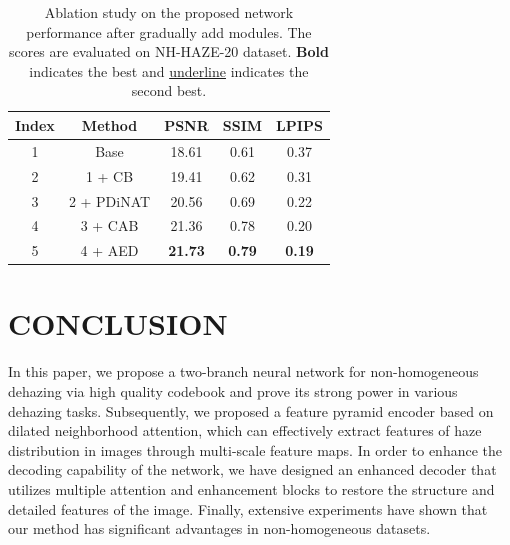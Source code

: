 \documentclass[lettersize,journal]{IEEEtran}
\begin{document}
\begin{table}
	\begin{center}
		\caption{Ablation study on the proposed network performance after gradually add modules. The scores are evaluated on NH-HAZE-20 dataset. \textbf{Bold} indicates the best and \underline{underline} indicates the second best.}
		\label{Ablation_study_1}
		\begin{tabular}{c | c | c | c | c }
			\hline
			Index & Method & PSNR & SSIM & LPIPS \\
			\hline
			1 & Base & 18.61 & 0.61 & 0.37 \\
			2 & 1 + CB & 19.41 & 0.62 & 0.31 \\
			3 & 2 + PDiNAT & 20.56 & 0.69 & 0.22 \\
			4 & 3 + CAB & 21.36 & 0.78 & 0.20 \\
			5 & 4 + AED & \textbf{21.73} & \textbf{0.79} & \textbf{0.19} \\
			\hline
		\end{tabular}
	\end{center}
\end{table}



\section{CONCLUSION}
In this paper, we propose a two-branch neural network for non-homogeneous dehazing via high quality codebook and prove its strong power in various dehazing tasks. Subsequently, we proposed a feature pyramid encoder based on dilated neighborhood attention, which can effectively extract features of haze distribution in images through multi-scale feature maps. In order to enhance the decoding capability of the network, we have designed an enhanced decoder that utilizes multiple attention and enhancement blocks to restore the structure and detailed features of the image. Finally, extensive experiments have shown that our method has significant advantages in non-homogeneous datasets.



{}
\end{document}
